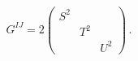 \begin{equation}
G^{IJ} = 2\left(\begin{array}{ccc} S^2 & & \\ & T^2 & \\ & & U^2
                \end{array} \right)\,.
\end{equation}

